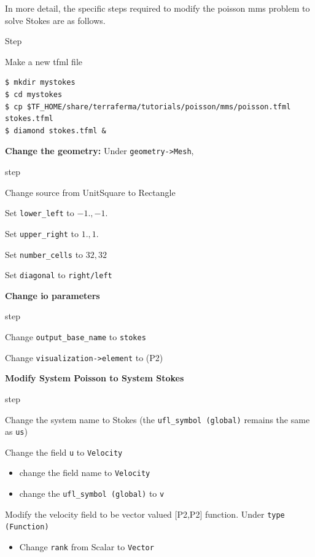 
In more detail, the specific steps required to modify the poisson mms
problem to solve Stokes are as follows.
\begin{steps}{Step}
\item Make a new tfml file
  \begin{lstlisting}[style=Bash]
$ mkdir mystokes
$ cd mystokes
$ cp $TF_HOME/share/terraferma/tutorials/poisson/mms/poisson.tfml stokes.tfml
$ diamond stokes.tfml &
  \end{lstlisting}%
\item \textbf{Change the geometry:} Under \texttt{geometry->Mesh},
  \begin{steps}{step}
  \item Change source from UnitSquare to Rectangle
  \item Set \texttt{lower\_left} to $-1.,-1.$
  \item Set \texttt{upper\_right} to $1.,1.$
  \item Set \texttt{number\_cells} to $32,32$
  \item Set \texttt{diagonal} to \texttt{right/left}
  \end{steps}
\item \textbf{Change io parameters}
  \begin{steps}{step}
  \item Change \texttt{output\_base\_name} to \texttt{stokes}
  \item Change \texttt{visualization->element} to (P2)
  \end{steps}
\item \textbf{Modify System Poisson to System Stokes}
  \begin{steps}{step}
  \item Change the system name to  Stokes (the \texttt{ufl\_symbol (global)}
    remains the same as \texttt{us})
  \item Change the field \texttt{u} to \texttt{Velocity}
    \begin{itemize}{}
    \item change the field name to \texttt{Velocity}
    \item change the \texttt{ufl\_symbol (global)} to \texttt{v}
    \end{itemize}
  \item Modify the velocity field to be vector valued [P2,P2]
    function.   Under \texttt{type (Function)}
    \begin{itemize}{}
    \item Change \texttt{rank} from Scalar to \texttt{Vector}

\end{itemize}
\end{steps}
\end{steps}
